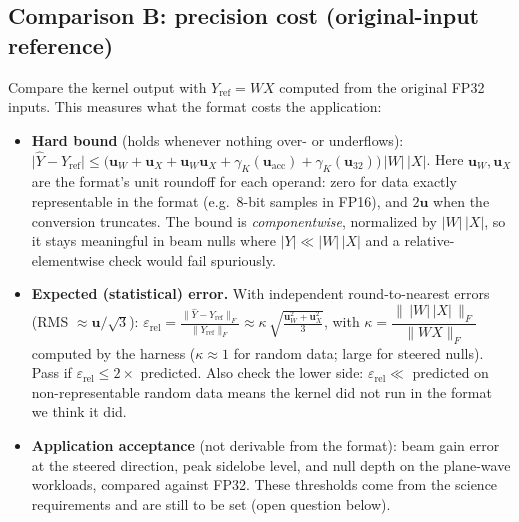 \documentclass[10pt,letterpaper]{article}
\newcommand{\ur}{\mathbf{u}}
\begin{document}
\subsection*{Comparison B: precision cost (original-input reference)}
Compare the kernel output with $Y_{\mathrm{ref}} = WX$ computed from the original FP32 inputs. This measures what the format costs the application:
\begin{itemize}
  \item \textbf{Hard bound} (holds whenever nothing over- or underflows):
  $\lvert \hat Y - Y_{\mathrm{ref}} \rvert \le \bigl(\ur_W + \ur_X + \ur_W\ur_X + \gamma_K(\ur_{\mathrm{acc}}) + \gamma_K(\ur_{32})\bigr)\,\lvert W\rvert\,\lvert X\rvert$. Here $\ur_W, \ur_X$ are the format's unit roundoff for each operand: zero for data exactly representable in the format (e.g.\ 8-bit samples in FP16), and $2\ur$ when the conversion truncates. The bound is \emph{componentwise}, normalized by $|W|\,|X|$, so it stays meaningful in beam nulls where $|Y| \ll |W|\,|X|$ and a relative-elementwise check would fail spuriously.
  \item \textbf{Expected (statistical) error.} With independent round-to-nearest errors (RMS $\approx \ur/\sqrt3$):
  $\displaystyle \varepsilon_{\mathrm{rel}} = \frac{\lVert \hat Y - Y_{\mathrm{ref}} \rVert_F}{\lVert Y_{\mathrm{ref}} \rVert_F} \approx \kappa\,\sqrt{\tfrac{\ur_W^2 + \ur_X^2}{3}}$, with $\kappa = \dfrac{\lVert\, |W|\,|X| \,\rVert_F}{\lVert WX \rVert_F}$ computed by the harness ($\kappa \approx 1$ for random data; large for steered nulls). Pass if $\varepsilon_{\mathrm{rel}} \le 2\times$ predicted. Also check the lower side: $\varepsilon_{\mathrm{rel}} \ll$ predicted on non-representable random data means the kernel did not run in the format we think it did.
  \item \textbf{Application acceptance} (not derivable from the format): beam gain error at the steered direction, peak sidelobe level, and null depth on the plane-wave workloads, compared against FP32. These thresholds come from the science requirements and are still to be set (open question below).
\end{itemize}
\end{document}
